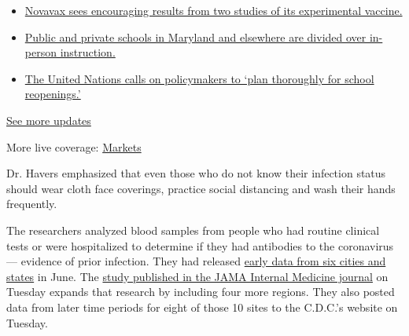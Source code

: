\begin{itemize}
\tightlist
\item
  \href{https://www.nytimes.com/2020/08/04/world/coronavirus-cases.html?action=click\&pgtype=Article\&state=default\&region=MAIN_CONTENT_1\&context=storylines_live_updates\#link-1228a480}{Novavax
  sees encouraging results from two studies of its experimental
  vaccine.}
\item
  \href{https://www.nytimes.com/2020/08/04/world/coronavirus-cases.html?action=click\&pgtype=Article\&state=default\&region=MAIN_CONTENT_1\&context=storylines_live_updates\#link-4825b93}{Public
  and private schools in Maryland and elsewhere are divided over
  in-person instruction.}
\item
  \href{https://www.nytimes.com/2020/08/04/world/coronavirus-cases.html?action=click\&pgtype=Article\&state=default\&region=MAIN_CONTENT_1\&context=storylines_live_updates\#link-50f7386d}{The
  United Nations calls on policymakers to `plan thoroughly for school
  reopenings.'}
\end{itemize}

\href{https://www.nytimes.com/2020/08/04/world/coronavirus-cases.html?action=click\&pgtype=Article\&state=default\&region=MAIN_CONTENT_1\&context=storylines_live_updates}{See
more updates}

More live coverage:
\href{https://www.nytimes.com/live/2020/08/04/business/stock-market-today-coronavirus?action=click\&pgtype=Article\&state=default\&region=MAIN_CONTENT_1\&context=storylines_live_updates}{Markets}

Dr. Havers emphasized that even those who do not know their infection
status should wear cloth face coverings, practice social distancing and
wash their hands frequently.

The researchers analyzed blood samples from people who had routine
clinical tests or were hospitalized to determine if they had antibodies
to the coronavirus --- evidence of prior infection. They had released
\href{https://www.nytimes.com/2020/06/27/health/coronavirus-antibodies-asymptomatic.html}{early
data from six cities and states} in June. The
\href{https://jamanetwork.com/journals/jamainternalmedicine/fullarticle/2768834?guestAccessKey=7a5c32e6-3c27-41b3-b46c-43c4a38bbe00\&utm_source=For_The_Media\&utm_medium=referral\&utm_campaign=ftm_links\&utm_content=tfl\&utm_term=072120}{study
published in the JAMA Internal Medicine journal} on Tuesday expands that
research by including four more regions. They also posted data from
later time periods for eight of those 10 sites to the C.D.C.'s website
on Tuesday.

